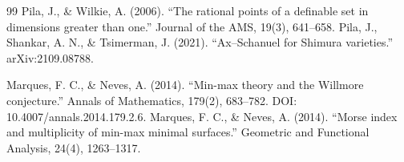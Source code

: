 \begin{thebibliography}{99}
 Pila, J., \& Wilkie, A. (2006). ``The rational points of a definable set in dimensions greater than one.'' Journal of the AMS, 19(3), 641--658.
 Pila, J., Shankar, A. N., \& Tsimerman, J. (2021). ``Ax--Schanuel for Shimura varieties.'' arXiv:2109.08788.

 Marques, F. C., \& Neves, A. (2014). ``Min-max theory and the Willmore conjecture.'' Annals of Mathematics, 179(2), 683--782. DOI: 10.4007/annals.2014.179.2.6.
 Marques, F. C., \& Neves, A. (2014). ``Morse index and multiplicity of min-max minimal surfaces.'' Geometric and Functional Analysis, 24(4), 1263--1317.

\end{thebibliography}
